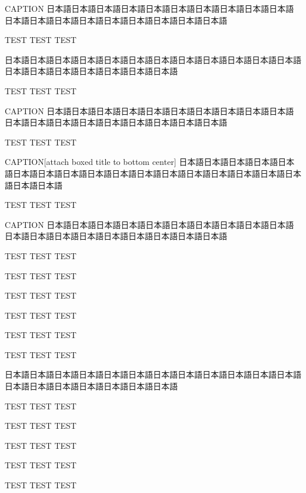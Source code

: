 \begin{rv@outerarcbox@caption}{CAPTION}
日本語日本語日本語日本語日本語日本語日本語日本語日本語日本語日本語日本語日本語日本語日本語日本語日本語日本語日本語

TEST TEST TEST

\end{rv@outerarcbox@caption}

\clearpage

\begin{rv@squaresepcaptionbox@nocaption}
日本語日本語日本語日本語日本語日本語日本語日本語日本語日本語日本語日本語日本語日本語日本語日本語日本語日本語日本語

TEST TEST TEST

\end{rv@squaresepcaptionbox@nocaption}

\begin{rv@squaresepcaptionbox@caption}{CAPTION}
日本語日本語日本語日本語日本語日本語日本語日本語日本語日本語日本語日本語日本語日本語日本語日本語日本語日本語日本語

TEST TEST TEST

\end{rv@squaresepcaptionbox@caption}

\begin{rv@squaresepcaptionbox@caption}{CAPTION}[attach boxed title to bottom center]
日本語日本語日本語日本語日本語日本語日本語日本語日本語日本語日本語日本語日本語日本語日本語日本語日本語日本語日本語

TEST TEST TEST

\end{rv@squaresepcaptionbox@caption}

\clearpage

\begin{rv@folderbox@caption}{CAPTION}
日本語日本語日本語日本語日本語日本語日本語日本語日本語日本語日本語日本語日本語日本語日本語日本語日本語日本語日本語

TEST TEST TEST

TEST TEST TEST

TEST TEST TEST

TEST TEST TEST

TEST TEST TEST

TEST TEST TEST

\end{rv@folderbox@caption}

\begin{rv@folderbox@nocaption}
日本語日本語日本語日本語日本語日本語日本語日本語日本語日本語日本語日本語日本語日本語日本語日本語日本語日本語日本語

TEST TEST TEST

TEST TEST TEST

TEST TEST TEST

TEST TEST TEST

TEST TEST TEST

\end{rv@folderbox@nocaption}

